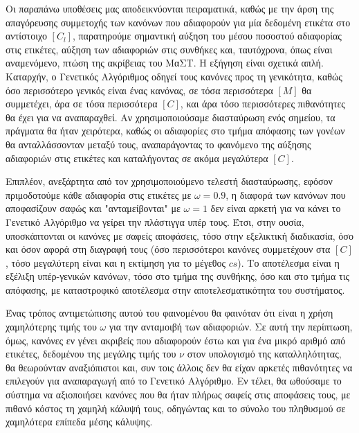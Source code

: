 Οι παραπάνω υποθέσεις μας αποδεικνύονται πειραματικά, καθώς με την άρση της απαγόρευσης συμμετοχής των κανόνων που αδιαφορούν για μία δεδομένη ετικέτα στο αντίστοιχο $[C_{l}]$, παρατηρούμε σημαντική αύξηση του μέσου ποσοστού αδιαφορίας στις ετικέτες, αύξηση των αδιαφοριών στις συνθήκες και, ταυτόχρονα, όπως είναι αναμενόμενο, πτώση της ακρίβειας του ΜαΣΤ. Η εξήγηση είναι σχετικά απλή. Καταρχήν, ο Γενετικός Αλγόριθμος οδηγεί τους κανόνες προς τη γενικότητα, καθώς όσο περισσότερο γενικός είναι ένας κανόνας, σε τόσα περισσότερα $[M]$ θα συμμετέχει, άρα σε τόσα περισσότερα $[C]$, και άρα τόσο περισσότερες πιθανότητες θα έχει για να αναπαραχθεί. Αν χρησιμοποιούσαμε διασταύρωση ενός σημείου, τα πράγματα θα ήταν χειρότερα, καθώς οι αδιαφορίες στο τμήμα απόφασης των γονέων θα ανταλλάσσονταν μεταξύ τους, αναπαράγοντας το φαινόμενο της αύξησης αδιαφοριών στις ετικέτες και καταλήγοντας σε ακόμα μεγαλύτερα $[C]$. 

Επιπλέον, ανεξάρτητα από τον χρησιμοποιούμενο τελεστή διασταύρωσης, εφόσον πριμοδοτούμε κάθε αδιαφορία στις ετικέτες με $\omega = 0.9$, η διαφορά των κανόνων που αποφασίζουν σαφώς και "ανταμείβονται" με $\omega = 1$ δεν είναι αρκετή για να κάνει το Γενετικό Αλγόριθμο να γείρει την πλάστιγγα υπέρ τους. Έτσι, στην ουσία, υποσκάπτονται οι κανόνες με σαφείς αποφάσεις, τόσο στην εξελικτική διαδικασία, όσο και όσον αφορά στη διαγραφή τους (όσο περισσότεροι κανόνες συμμετέχουν στα $[C]$, τόσο μεγαλύτερη είναι και η εκτίμηση για το μέγεθος $cs$). Το αποτέλεσμα είναι η εξέλιξη υπέρ-γενικών κανόνων, τόσο στο τμήμα της συνθήκης, όσο και στο τμήμα τις απόφασης, με καταστροφικό αποτέλεσμα στην αποτελεσματικότητα του συστήματος. 

Ένας τρόπος αντιμετώπισης αυτού του φαινομένου θα φαινόταν ότι είναι η χρήση χαμηλότερης τιμής του $\omega$ για την ανταμοιβή των αδιαφοριών. Σε αυτή την περίπτωση, όμως, κανόνες εν γένει ακριβείς που αδιαφορούν έστω και για ένα μικρό αριθμό από ετικέτες, δεδομένου της μεγάλης τιμής του $\nu$ στον υπολογισμό της καταλληλότητας, θα θεωρούνταν αναξιόπιστοι και, συν τοις άλλοις δεν θα είχαν αρκετές πιθανότητες να επιλεγούν για αναπαραγωγή από το Γενετικό Αλγόριθμο. Εν τέλει, θα ωθούσαμε το σύστημα να αξιοποιήσει κανόνες που θα ήταν πλήρως σαφείς στις αποφάσεις τους, με πιθανό κόστος τη χαμηλή κάλυψή τους, οδηγώντας και το σύνολο του πληθυσμού σε χαμηλότερα επίπεδα μέσης κάλυψης.

